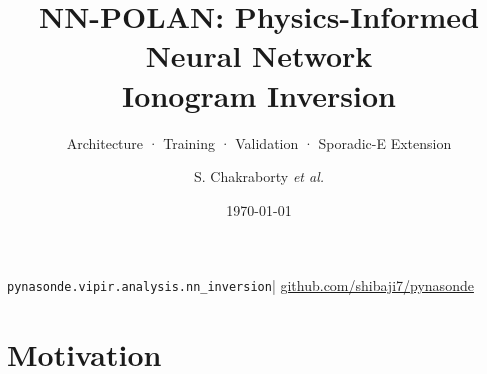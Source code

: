 \documentclass[aspectratio=169,10pt]{beamer}
\title[NN-POLAN — Show \& Tell]{%
  \textbf{NN-POLAN}: Physics-Informed Neural Network\\
  Ionogram Inversion}
\subtitle{Architecture · Training · Validation · Sporadic-E Extension}
\author{S. Chakraborty \textit{et al.}}
\institute{Embry-Riddle Aeronautical University \;|\; pynasonde project}
\date{\today}
\begin{document}

\begin{frame}
  \titlepage
  \vspace{-0.4cm}
  \begin{center}
    \scriptsize
    \texttt{pynasonde.vipir.analysis.nn\_inversion}\quad|\quad
    \href{https://github.com/shibaji7/pynasonde}{github.com/shibaji7/pynasonde}
  \end{center}
\end{frame}


\section{Motivation}
\end{document}
